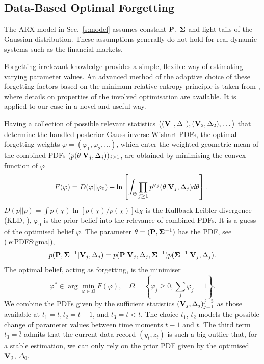 \subsection{Data-Based Optimal Forgetting} \label{s:forgetting}
The ARX model in Sec.\ \ref{s:model} assumes constant $\mathbf{P}$, $\mathbf{\Sigma}$ and light-tails of the Gaussian distribution. These assumptions generally do not hold for real dynamic systems such as the financial markets.

Forgetting irrelevant knowledge provides a simple, flexible way of estimating varying parameter values. An advanced method of the adaptive choice of these forgetting factors based on the minimum relative entropy principle is taken from \cite{Kar:25}, where details on properties of the involved optimisation are available. It is applied to our case in a novel and useful way. 

Having a collection of possible relevant statistics $\big((\mathbf{V}_{1},\Delta_{1}),(\mathbf{V}_{2},\Delta_{2}),\ldots\big)$ that determine the handled posterior Gauss-inverse-Wishart PDFs, the optimal forgetting weights $\varphi = (\varphi_1, \varphi_2, \dots)$, which enter the weighted geometric mean of the combined PDFs $(p(\theta|\mathbf{V}_{j},\Delta_{j}))_{j\geq 1}$, are obtained by minimising the convex function of $\varphi$
\begin{equation}
    \label{e:Fdefinition}
\hspace*{-1ex}F(\varphi) = D(\varphi||\varphi_{0}) - \ln\left[\int_{\Theta}\prod_{j\geq 1}p^{\varphi_{j}}(\theta|\mathbf{V}_{j}, \Delta_j)d\theta\right].
\end{equation}
$D(p||\bar{p})=\int p(\chi)\ln[p(\chi)/\bar{p}(\chi)]\mathrm{d}\chi$ is the Kullback-Leibler divergence (KLD, \cite{KulLei:51}), $\varphi_{0}$ is the prior belief into the relevance of combined PDFs. It is a guess of the optimised belief $\varphi$. The parameter $\theta=(\mathbf{P},\mathbf{\Sigma}^{-1})$ has the PDF,  see (\ref{e:PDFSigma}),
\begin{equation}
\nonumber
p(\mathbf{P},\mathbf{\Sigma}^{-1}|\mathbf{V}_{j}, \Delta_{j}) = p(\mathbf{P}|\mathbf{V}_{j}, \Delta_{j}, \mathbf{\Sigma}^{-1})p(\mathbf{\Sigma}^{-1}|\mathbf{V}_{j}, \Delta_{j}).
\end{equation}
The optimal belief, acting as forgetting, is the minimiser
\begin{equation*}
\varphi^{\ast} \in \arg\min_{\varphi\in\Omega} F(\varphi),\quad \Omega= \left\{\varphi_{j} \geq 0, \sum_j\varphi_{j} = 1\right\}.
\end{equation*}
We combine the PDFs given by the sufficient statistics $(\mathbf{V}_{j},\Delta_{j})_{j=1}^{j=3}$ as those available at $t_{1} = t, t_{2} = t-1$, and $t_3 =\bar{t}<t$. The choice $t_{1}$, $t_{2}$ models the possible change of parameter values between time moments $t-1$ and $t$. The third term $t_{3} = \bar{t}$ admits that the current data record $(y_{t},z_{t})$ is such a big outlier that, for a stable estimation, we can only rely on the prior PDF given by the optimised $\mathbf{V}_{0}$, $\Delta_{0}$.

